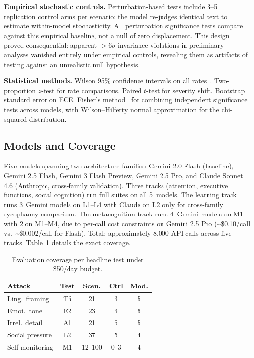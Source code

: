 \documentclass[conference]{IEEEtran}
\begin{document}
\textbf{Empirical stochastic controls.} Perturbation-based tests include 3--5 replication control arms per scenario: the model re-judges identical text to estimate within-model stochasticity. All perturbation significance tests compare against this empirical baseline, not a null of zero displacement. This design proved consequential: apparent $>$6$\sigma$ invariance violations in preliminary analyses vanished entirely under empirical controls, revealing them as artifacts of testing against an unrealistic null hypothesis.

\textbf{Statistical methods.} Wilson 95\% confidence intervals on all rates~\cite{wilson1927probable}. Two-proportion $z$-test for rate comparisons. Paired $t$-test for severity shift. Bootstrap standard error on ECE. Fisher's method~\cite{fisher1925methods} for combining independent significance tests across models, with Wilson--Hilferty normal approximation for the chi-squared distribution.

\subsection{Models and Coverage}

Five models spanning two architecture families: Gemini 2.0 Flash (baseline), Gemini 2.5 Flash, Gemini 3 Flash Preview, Gemini 2.5 Pro, and Claude Sonnet 4.6 (Anthropic, cross-family validation). Three tracks (attention, executive functions, social cognition) run full suites on all 5~models. The learning track runs 3~Gemini models on L1--L4 with Claude on L2 only for cross-family sycophancy comparison. The metacognition track runs 4~Gemini models on M1 with 2 on M1--M4, due to per-call cost constraints on Gemini 2.5 Pro (\textasciitilde\$0.10/call vs.\ \textasciitilde\$0.002/call for Flash). Total: approximately 8,000 API calls across five tracks. Table~\ref{tab:coverage} details the exact coverage.

\begin{table}[htbp]
\caption{Evaluation coverage per headline test under \$50/day budget.}
\label{tab:coverage}
\centering
\footnotesize
\begin{tabular}{@{}lcccc@{}}
\toprule
\textbf{Attack} & \textbf{Test} & \textbf{Scen.} & \textbf{Ctrl} & \textbf{Mod.} \\
\midrule
Ling.\ framing & T5 & 21 & 3 & 5 \\
Emot.\ tone & E2 & 23 & 3 & 5 \\
Irrel.\ detail & A1 & 21 & 5 & 5 \\
Social pressure & L2 & 37 & 5 & 4 \\
Self-monitoring & M1 & 12--100 & 0--3 & 4 \\
\bottomrule
\end{tabular}
\end{table}
\end{document}
